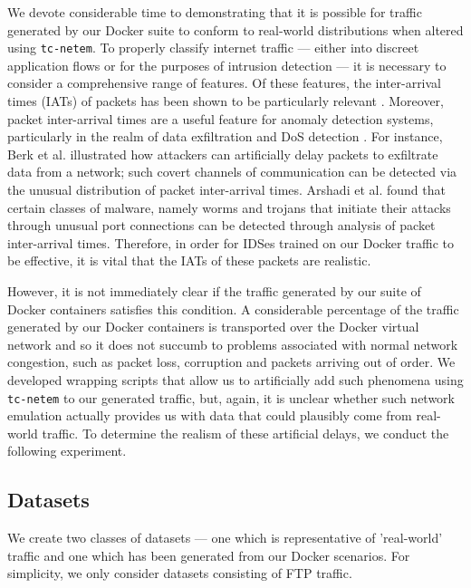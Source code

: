 \documentclass[msc,deptreport, cs]{infthesis} %
\begin{document}
We devote considerable time to demonstrating that it is possible for traffic generated by our Docker suite to conform to real-world distributions when altered using \texttt{tc-netem}. To properly classify internet traffic --- either into discreet application flows or for the purposes of intrusion detection --- it is necessary to consider a comprehensive range of features. Of these features, the inter-arrival times (IATs) of packets has been shown to be particularly relevant \cite{zander2005automated} \cite{nguyen2008survey}. Moreover, packet inter-arrival times are a useful feature for anomaly detection systems, particularly in the realm of data exfiltration and DoS detection \cite{iorliam2016flow}. For instance, Berk et al. \cite{berk2005detection} illustrated how attackers can artificially delay packets to exfiltrate data from a network; such covert channels of communication can be detected via the unusual distribution of packet inter-arrival times. Arshadi et al. \cite{arshadi2011tcp} found that certain classes of malware, namely worms and trojans that initiate their attacks through unusual port connections can be detected through analysis of packet inter-arrival times. Therefore, in order for IDSes trained on our Docker traffic to be effective, it is vital that the IATs of these packets are realistic.

However, it is not immediately clear if the traffic generated by our suite of Docker containers satisfies this condition. A considerable percentage of the traffic generated by our Docker containers is transported over the Docker virtual network and so it does not succumb to problems associated with normal network congestion, such as packet loss, corruption and packets arriving out of order. We developed wrapping scripts that allow us to artificially add such phenomena using \texttt{tc-netem} to our generated traffic, but, again, it is unclear whether such network emulation actually provides us with data that could plausibly come from real-world traffic. To determine the realism of these artificial delays, we conduct the following experiment.



\subsection{Datasets}

We create two classes of datasets --- one which is representative of 'real-world' traffic and one which has been generated from our Docker scenarios. For simplicity, we only consider datasets consisting of FTP traffic.
\end{document}
